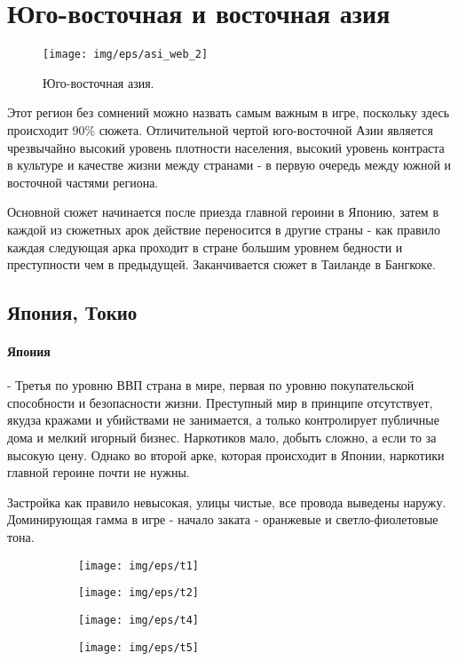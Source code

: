 \documentclass[11pt]{report}
\begin{document}
\clearpage
\section{Юго-восточная и восточная азия}
\begin{figure}[!b]
	\begin{center}
		\texttt{[image: img/eps/asi\_web\_2]}
  		\caption{Юго-восточная азия.}
  		\label{img:asia}
	\end{center}
\end{figure}
Этот регион без сомнений можно назвать самым важным в игре, поскольку здесь происходит 90\% сюжета. Отличительной чертой юго-восточной Азии является чрезвычайно высокий уровень плотности населения, высокий уровень контраста в культуре и качестве жизни между странами - в первую очередь между южной и восточной частями региона.

Основной сюжет начинается после приезда главной героини в Японию, затем в каждой из сюжетных арок действие переносится в другие страны - как правило каждая следующая арка проходит в стране большим уровнем бедности и преступности чем в предыдущей. Заканчивается сюжет в Таиланде в Бангкоке.

\clearpage
\subsection{Япония, Токио}
\paragraph{Япония} - Третья по уровню ВВП страна в мире, первая по уровню покупательской способности и безопасности жизни. Преступный мир в принципе отсутствует, якудза кражами и убийствами не занимается, а только контролирует публичные дома и мелкий игорный бизнес. Наркотиков мало, добыть сложно, а если то за высокую цену. Однако во второй арке, которая происходит в Японии, наркотики главной героине почти не нужны. 

Застройка как правило невысокая, улицы чистые, все провода выведены наружу. Доминирующая гамма в игре - начало заката - оранжевые и светло-фиолетовые тона.

\vspace{8ex}
\begin{center}
	\begin{figure}[h]
		\begin{subfigure}{.5\linewidth}
			\texttt{[image: img/eps/t1]}
		\end{subfigure}
		\hfill
		\begin{subfigure}{.5\linewidth}
			\texttt{[image: img/eps/t2]}
		\end{subfigure}
		\vfill
		\vspace{2ex}
		\begin{subfigure}{.5\linewidth}
			\texttt{[image: img/eps/t4]}
		\end{subfigure}
		\hfill
		\begin{subfigure}{.5\linewidth}
			\texttt{[image: img/eps/t5]}
		\end{subfigure}
	\end{figure}
\end{center}
\end{document}
